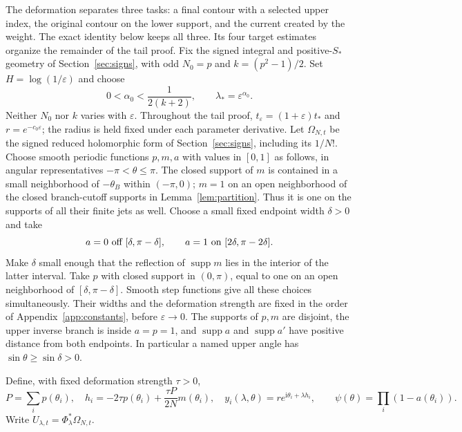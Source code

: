 \documentclass[11pt]{article}
\numberwithin{equation}{section}
\theoremstyle{definition}
\newcommand{\ii}{\mathrm i}
\newcommand{\eps}{\varepsilon}
\begin{document}
The deformation separates three tasks: a final contour with a selected
upper index, the original contour on the lower support, and the current
created by the weight. The exact identity below keeps all three. Its
four target estimates organize the remainder of the tail proof.
Fix the signed integral and positive-$S_*$ geometry of Section~\ref{sec:signs}, with odd $N_0=p$ and $k=(p^2-1)/2$.
Set \(H=\log(1/\eps)\) and choose
\begin{equation}
 0<\alpha_0<\frac1{2(k+2)},\qquad \lambda_*=\eps^{\alpha_0}.
 \label{eq:alphachoice}
\end{equation}
Neither \(N_0\) nor \(k\) varies with \(\eps\). Throughout the tail proof, $t_\eps=(1+\eps)t_*$ and $r=e^{-c_0\eps}$; the radius is held fixed under each parameter derivative.
Let $\Omega_{N,t}$ be the signed reduced holomorphic form of Section~\ref{sec:signs}, including its $1/N!$.
Choose smooth periodic functions \(p,m,a\) with values in \([0,1]\)
as follows, in angular representatives \(-\pi<\theta\le\pi\).
The closed support of \(m\) is contained in a small neighborhood of
\(-\theta_B\) within \((-\pi,0)\); \(m=1\) on an open neighborhood
of the closed branch-cutoff supports in Lemma~\ref{lem:partition}.
Thus it is one on the supports of all their finite jets as well.
Choose a small fixed endpoint width \(\delta>0\) and take
\[
 a=0\ \hbox{off }[\delta,\pi-\delta],\qquad
 a=1\ \hbox{on }[2\delta,\pi-2\delta].
\]
Make \(\delta\) small enough that the reflection of
\(\operatorname{supp}m\) lies in the interior of the latter interval.
Take \(p\) with closed support in \((0,\pi)\), equal to one on
an open neighborhood of \([\delta,\pi-\delta]\).
Smooth step functions give all these choices simultaneously.
Their widths and the deformation strength are fixed in the order
of Appendix~\ref{app:constants}, before \(\eps\to0\).
The supports of \(p,m\) are disjoint, the upper inverse branch is
inside \(a=p=1\), and \(\operatorname{supp}a\) and
\(\operatorname{supp}a'\) have positive distance from both endpoints.
In particular a named upper angle has \(\sin\theta\ge\sin\delta>0\).

Define, with fixed deformation strength \(\tau>0\),
\[
 P=\sum_i p(\theta_i),\quad
 h_i=-2\tau p(\theta_i)+\frac{\tau P}{2N}m(\theta_i),\quad
 y_i(\lambda,\theta)=r e^{\ii\theta_i+\lambda h_i},
 \qquad \psi(\theta)=\prod_i(1-a(\theta_i)).
\]
Write \(U_{\lambda,t}=\Phi_\lambda^*\Omega_{N,t}\).
\end{document}
